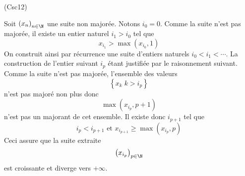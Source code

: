 \begin{tiny}(Csc12)\end{tiny} Soit $\left( x_n\right)_{n\in \N}$ une suite  non majorée.\newline
Notons $i_0=0$. Comme la suite n'est pas majorée, il existe un entier naturel $i_1 > i_0$ tel que 
\begin{displaymath}
x_{i_1} > \max(x_{i_0},1)  
\end{displaymath}
On construit ainsi par récurrence une suite d'entiers naturels $i_0 < i_1 < \cdots $. La construction de l'entier suivant $i_p$ étant justifiée par le raisonnement suivant.\newline
Comme la suite n'est pas majorée, l'ensemble des valeurs 
\begin{displaymath}
  \left\lbrace x_k \; k > i_p\right\rbrace 
\end{displaymath}
n'est pas majoré non plus donc 
\begin{displaymath}
  \max(x_{i_p}, p+1)
\end{displaymath}
n'est pas un majorant de cet ensemble. Il existe donc $i_{p+1}$ tel que
\begin{displaymath}
  i_p < i_{p+1} \text{ et } x_{i_{p+1}} \geq \max(x_{i_p},p)
\end{displaymath}
Ceci assure que la suite extraite 
\begin{displaymath}
  \left( x_{i_p}\right)_{p\in \N}
\end{displaymath}
est croissante et diverge vers $+\infty$.